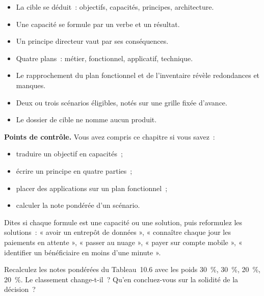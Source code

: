 \begin{boxresume}
\begin{itemize}
    \item La cible se déduit~: objectifs, capacités, principes, architecture.
    \item Une capacité se formule par un verbe et un résultat.
    \item Un principe directeur vaut par ses conséquences.
    \item Quatre plans~: métier, fonctionnel, applicatif, technique.
    \item Le rapprochement du plan fonctionnel et de l'inventaire révèle redondances et manques.
    \item Deux ou trois scénarios éligibles, notés sur une grille fixée d'avance.
    \item Le dossier de cible ne nomme aucun produit.
\end{itemize}
\end{boxresume}

\begin{boxinfo}
\textbf{Points de contrôle.} Vous avez compris ce chapitre si vous savez~:
\begin{itemize}
    \item traduire un objectif en capacités~;
    \item écrire un principe en quatre parties~;
    \item placer des applications sur un plan fonctionnel~;
    \item calculer la note pondérée d'un scénario.
\end{itemize}
\end{boxinfo}

\begin{boxexo}[title={\ding{45}\quad Exercice~10.1. Capacité ou solution \niveaubase}]
Dites si chaque formule est une capacité ou une solution, puis reformulez les solutions~: « avoir un entrepôt de données », « connaître chaque jour les paiements en attente », « passer au nuage », « payer sur compte mobile », « identifier un bénéficiaire en moins d'une minute ».
\end{boxexo}

\begin{boxexo}[title={\ding{45}\quad Exercice~10.2. Recalculer \niveaumoyen}]
Recalculez les notes pondérées du Tableau~10.6 avec les poids 30~\%, 30~\%, 20~\%, 20~\%. Le classement change-t-il~? Qu'en concluez-vous sur la solidité de la décision~?
\end{boxexo}

